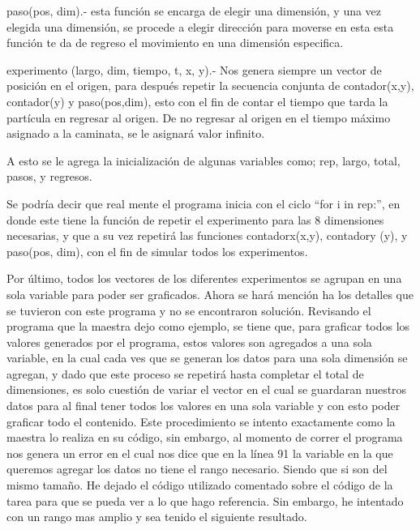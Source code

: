 \documentclass{article}
\begin{document}
paso(pos, dim).- esta función se encarga de elegir una dimensión, y una vez elegida una dimensión, se procede a elegir dirección para moverse en esta esta función te da de regreso el movimiento en una dimensión especifica.
\newline


experimento (largo, dim, tiempo, t, x, y).- Nos genera siempre un vector de posición en el origen, para después repetir la secuencia conjunta de contador(x,y), contador(y) y paso(pos,dim), esto con el fin de contar el tiempo que tarda la partícula en regresar al origen. De no regresar al origen en el tiempo máximo asignado a la caminata, se le asignará valor infinito.
\newline
\newline

A esto se le agrega la inicialización de algunas variables como; rep, largo, total, pasos, y regresos.
\newline


 Se podría decir que real mente el programa inicia con el ciclo “for i in rep:”, en donde este tiene la función de repetir el experimento para las 8 dimensiones necesarias, y que a su vez repetirá las funciones contadorx(x,y), contadory (y), y paso(pos, dim), con el fin de simular todos los experimentos.
\newline





Por último, todos los vectores de los diferentes experimentos se agrupan en una sola variable para poder ser graficados. Ahora se hará mención ha los detalles que se tuvieron con este programa y no se encontraron solución. Revisando el programa que la maestra dejo como ejemplo, se tiene que, para graficar todos los valores generados por el programa, estos valores son agregados a una sola variable, en la cual cada ves que se generan los datos para una sola dimensión se agregan, y dado que este proceso se repetirá hasta completar el total de dimensiones, es solo cuestión de variar el vector en el cual se guardaran nuestros datos para al final tener todos los valores en una sola variable y con esto poder graficar todo el contenido.  Este procedimiento se intento exactamente como la maestra lo realiza en su código, sin embargo, al momento de correr el programa nos genera un error en el cual nos dice que en la línea 91 la variable en la que queremos agregar los datos no tiene el rango necesario. Siendo que si son del mismo tamaño. He dejado el código utilizado comentado sobre el código de la tarea para que se pueda ver a lo que hago referencia. Sin embargo, he intentado con un rango mas amplio y sea tenido el siguiente resultado.
\end{document}
